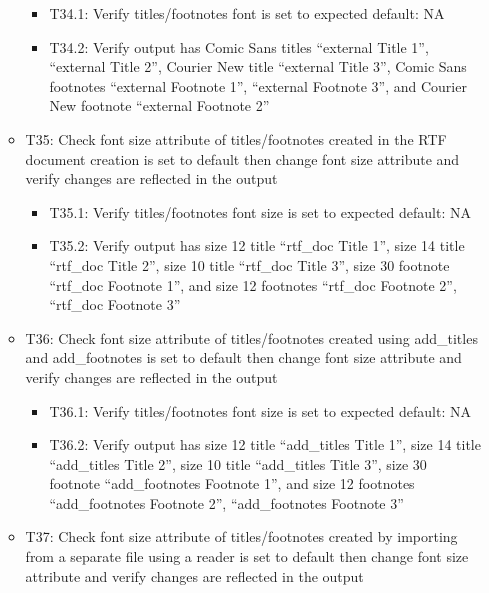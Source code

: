 \documentclass[]{article}
\providecommand{\tightlist}{%
  \setlength{\itemsep}{0pt}\setlength{\parskip}{0pt}}
\begin{document}
\begin{itemize}
\begin{itemize}
    \begin{itemize}
    \tightlist
    \item
      T34.1: Verify titles/footnotes font is set to expected default: NA
    \item
      T34.2: Verify output has Comic Sans titles ``external Title 1'',
      ``external Title 2'', Courier New title ``external Title 3'',
      Comic Sans footnotes ``external Footnote 1'', ``external Footnote
      3'', and Courier New footnote ``external Footnote 2''
    \end{itemize}
  \item
    T35: Check font size attribute of titles/footnotes created in the
    RTF document creation is set to default then change font size
    attribute and verify changes are reflected in the output

    \begin{itemize}
    \tightlist
    \item
      T35.1: Verify titles/footnotes font size is set to expected
      default: NA
    \item
      T35.2: Verify output has size 12 title ``rtf\_doc Title 1'', size
      14 title ``rtf\_doc Title 2'', size 10 title ``rtf\_doc Title 3'',
      size 30 footnote ``rtf\_doc Footnote 1'', and size 12 footnotes
      ``rtf\_doc Footnote 2'', ``rtf\_doc Footnote 3''
    \end{itemize}
  \item
    T36: Check font size attribute of titles/footnotes created using
    add\_titles and add\_footnotes is set to default then change font
    size attribute and verify changes are reflected in the output

    \begin{itemize}
    \tightlist
    \item
      T36.1: Verify titles/footnotes font size is set to expected
      default: NA
    \item
      T36.2: Verify output has size 12 title ``add\_titles Title 1'',
      size 14 title ``add\_titles Title 2'', size 10 title ``add\_titles
      Title 3'', size 30 footnote ``add\_footnotes Footnote 1'', and
      size 12 footnotes ``add\_footnotes Footnote 2'', ``add\_footnotes
      Footnote 3''
    \end{itemize}
  \item
    T37: Check font size attribute of titles/footnotes created by
    importing from a separate file using a reader is set to default then
    change font size attribute and verify changes are reflected in the
    output


\end{itemize}
\end{itemize}
\end{document}
